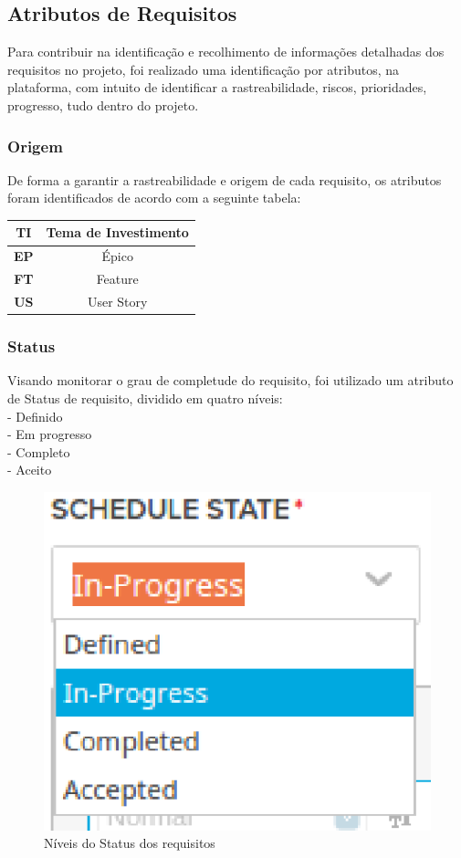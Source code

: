 \subsection {Atributos de Requisitos}

Para  contribuir na identificação e recolhimento de informações detalhadas dos requisitos no projeto, foi realizado uma identificação por atributos, na plataforma, com intuito de identificar a rastreabilidade, riscos, prioridades, progresso, tudo dentro do projeto. \\

\subsubsection{Origem}
De forma a garantir a rastreabilidade e origem de cada requisito, os atributos foram identificados de acordo com a seguinte tabela:\\

\begin{tabular}{|c|c|}
  \hline
  \textbf{TI} & Tema de Investimento \\ \hline
  \textbf{EP} & Épico \\ \hline
  \textbf{FT} & Feature \\ \hline
  \textbf{US} & User Story \\ \hline
\end{tabular}

\subsubsection{Status}
Visando monitorar o grau de completude do requisito, foi utilizado um atributo de Status de requisito, dividido em quatro níveis: \\
\tab - Definido\\
\tab - Em progresso\\
\tab - Completo\\
\tab - Aceito\\

\begin{figure}[h]
    \centering
    \label{fig01}
        \includegraphics[keepaspectratio=true,scale=1]{figuras/RallyDev/status.eps}
    \caption{Níveis do Status dos requisitos}
\end{figure}

